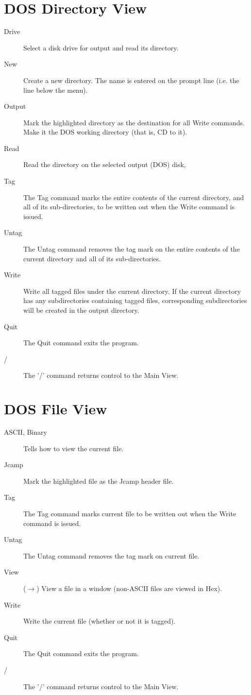 \section{DOS Directory View}

\begin{description}
 
\item[Drive] \nl
            Select a disk drive for output and read its directory.
\item[New] \nl
	    Create a new directory.  The name is entered on the prompt
	    line (i.e. the line below the menu).
\item[Output] \nl
            Mark the highlighted directory as the destination for
            all Write commands.  Make it the DOS working directory
            (that is, CD to it).
\item[Read] \nl
            Read the directory on the selected output (DOS) disk,
\item[Tag] \nl
            The Tag command marks the entire contents of the current
            directory, and all of its sub-directories, to be written
            out when the Write command is issued.
\item[Untag] \nl
            The Untag command removes the tag mark on the entire contents
            of the current directory and all of its sub-directories.
\item[Write] \nl
            Write all tagged files under the current directory. If the
	    current directory has any subdirectories containing tagged
files, corresponding subdirectories will be created in the output
directory.
\item[Quit] \nl
            The Quit command exits the program.
\item[/] \nl
            The '/' command returns control to the Main View.
\end{description}


\section{DOS File View}

\begin{description}
\item[ASCII, Binary] \nl
            Tells how to view the current file.
\item[Jcamp] \nl
            Mark the highlighted file as the Jcamp header file.
\item[Tag] \nl
            The Tag command marks current file to be written out
            when the Write command is issued.
\item[Untag] \nl
            The Untag command removes the tag mark on current file.
\item[View] ($\rightarrow$) \nl
            View a file in a window (non-ASCII files are viewed in Hex).
\item[Write] \nl
            Write the current file (whether or not it is tagged).
\item[Quit] \nl
            The Quit command exits the program.
\item[/] \nl
            The '/' command returns control to the Main View.
\end{description}


